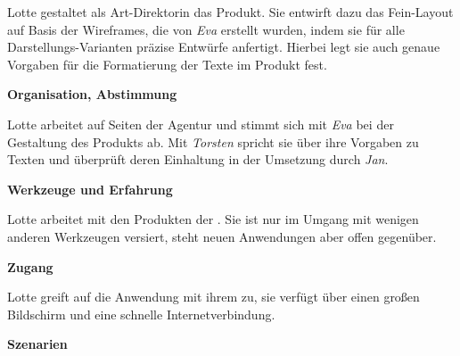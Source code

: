 \begin{multicols}{2}

\begin{center}
\end{center}


Lotte gestaltet als Art-Direktorin das Produkt. Sie entwirft dazu das Fein-Layout auf Basis der Wireframes, die von \emph{Eva} erstellt wurden, indem sie für alle Darstellungs-Varianten präzise Entwürfe anfertigt. Hierbei legt sie auch genaue Vorgaben für die Formatierung der Texte im Produkt fest.

\textbf{Organisation, Abstimmung}

Lotte arbeitet auf Seiten der Agentur und stimmt sich mit \emph{Eva} bei der Gestaltung des Produkts ab. Mit \emph{Torsten} spricht sie über ihre Vorgaben zu Texten und überprüft deren Einhaltung in der Umsetzung durch \emph{Jan}.

\textbf{Werkzeuge und Erfahrung}

Lotte arbeitet mit den Produkten der . Sie ist nur im Umgang mit wenigen anderen Werkzeugen versiert, steht neuen Anwendungen aber offen gegenüber.

\textbf{Zugang}

Lotte greift auf die Anwendung mit ihrem  zu, sie verfügt über einen großen Bildschirm und eine schnelle Internetverbindung.

\columnbreak

\textbf{Szenarien}


\end{multicols}
